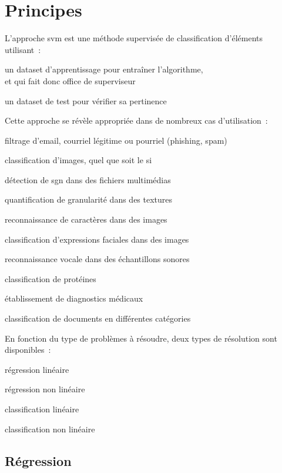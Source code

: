 \section{Principes}

L’approche \gls{svm} est une méthode supervisée de classification d’éléments
utilisant :
\begin{enum}
\item{un \gls{dataset} d’apprentissage pour entraîner l’algorithme,\\
et qui fait donc office de superviseur}
\item{un \gls{dataset} de test pour vérifier sa pertinence}
\end{enum}

Cette approche se révèle appropriée dans de nombreux cas d’utilisation :
\begin{itmz}
\item{filtrage d’email, courriel légitime ou pourriel (phishing, spam)}
\item{classification d’images, quel que soit le \gls{si}}
\item{détection de \gls{sgn} dans des fichiers multimédias}
\item{quantification de granularité dans des textures}
\item{reconnaissance de caractères dans des images}
\item{classification d’expressions faciales dans des images}
\item{reconnaissance vocale dans des échantillons sonores}
\item{classification de protéines}
\item{établissement de diagnostics médicaux}
\item{classification de documents en différentes catégories}
\end{itmz}

En fonction du type de problèmes à résoudre,
deux types de résolution sont disponibles :
\begin{itmz}
\item{régression linéaire}
\item{régression non linéaire}
\item{classification linéaire}
\item{classification non linéaire}
\end{itmz}

\subsection{Régression}

